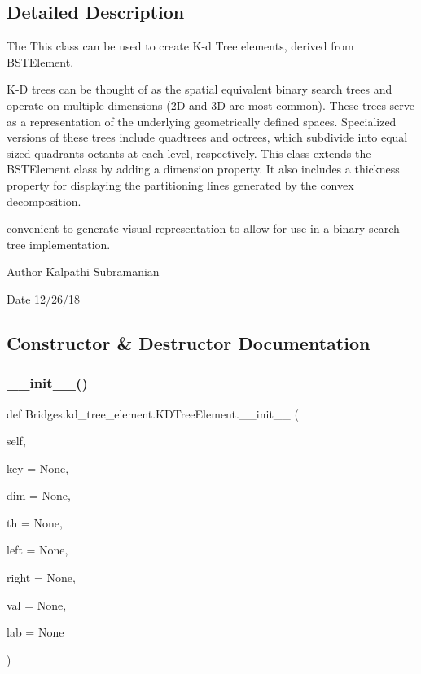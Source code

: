 \subsection{Detailed Description}
The This class can be used to create K-\/d Tree elements, derived from B\+S\+T\+Element. 

K-\/D trees can be thought of as the spatial equivalent binary search trees and operate on multiple dimensions (2D and 3D are most common). These trees serve as a representation of the underlying geometrically defined spaces. Specialized versions of these trees include quadtrees and octrees, which subdivide into equal sized quadrants octants at each level, respectively. This class extends the B\+S\+T\+Element class by adding a dimension property. It also includes a thickness property for displaying the partitioning lines generated by the convex decomposition.

convenient to generate visual representation to allow for use in a binary search tree implementation.

\begin{DoxyAuthor}{Author}
Kalpathi Subramanian 
\end{DoxyAuthor}
\begin{DoxyDate}{Date}
12/26/18 
\end{DoxyDate}


\subsection{Constructor \& Destructor Documentation}
\mbox{\label{class_bridges_1_1kd__tree__element_1_1_k_d_tree_element_abbcf996ed59849ba4e656ec2e002866e}} 
\subsubsection{\texorpdfstring{\+\_\+\+\_\+init\+\_\+\+\_\+()}{\_\_init\_\_()}}
{\footnotesize\ttfamily def Bridges.\+kd\+\_\+tree\+\_\+element.\+K\+D\+Tree\+Element.\+\_\+\+\_\+init\+\_\+\+\_\+ (\begin{DoxyParamCaption}\item[{}]{self,  }\item[{}]{key = {\ttfamily None},  }\item[{}]{dim = {\ttfamily None},  }\item[{}]{th = {\ttfamily None},  }\item[{}]{left = {\ttfamily None},  }\item[{}]{right = {\ttfamily None},  }\item[{}]{val = {\ttfamily None},  }\item[{}]{lab = {\ttfamily None} }\end{DoxyParamCaption})}



